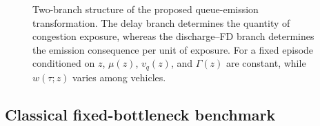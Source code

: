 \begin{figure}[t]
\centering
{}
\caption{Two-branch structure of the proposed queue-emission transformation.
The delay branch determines the quantity of congestion exposure, whereas the
discharge--FD branch determines the emission consequence per unit of exposure.
For a fixed episode conditioned on $z$, $\mu(z)$, $v_q(z)$, and $\Gamma(z)$
are constant, while $w(\tau;z)$ varies among vehicles.}
\label{fig:two_branch_placeholder}
\end{figure}



\subsection{Classical fixed-bottleneck benchmark}
\label{subsec:fixed_bottleneck}

